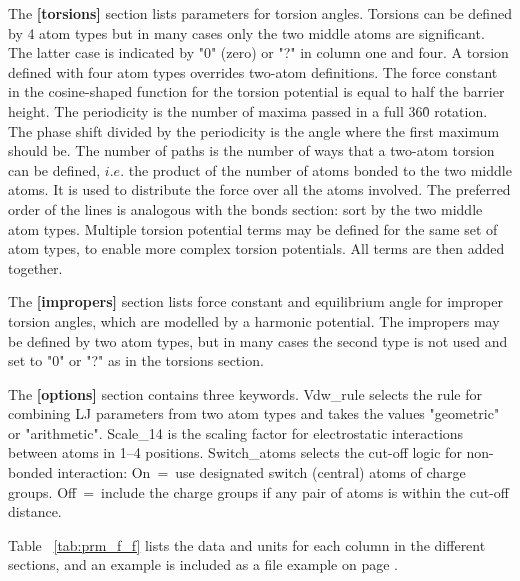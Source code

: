 \documentclass[a4paper,11pt]{article}
\let\origref\ref
\def\ref#1{\unskip~\origref{#1}}
\begin{document}
The   \textbf{[torsions]}  section   lists   parameters  for   torsion
angles. Torsions can be defined by 4 atom types but in many cases only
the two middle atoms are significant.  The latter case is indicated by
"0" (zero) or "?" in column one  and four. A torsion defined with four
atom types overrides  two-atom definitions. The force  constant in the
cosine-shaped function for the torsion  potential is equal to half the
barrier height.  The periodicity is the  number of maxima passed  in a
full 360\r{ } rotation. The phase  shift divided by the periodicity is
the angle  where the first maximum  should be. The number  of paths is
the number of ways that a  two-atom torsion can be defined, $i.e.$ the
product of the number  of atoms bonded to the two  middle atoms. It is
used  to  distribute  the  force  over all  the  atoms  involved.  The
preferred order of the lines is analogous with the bonds section: sort
by the two middle atom types.  Multiple torsion potential terms may be
defined for the same set of atom types, to enable more complex torsion
potentials. All terms are then added together.

The \textbf{[impropers]} section lists  force constant and equilibrium
angle for  improper torsion angles,  which are modelled by  a harmonic
potential. The impropers may be defined by two atom types, but in many
cases the  second type is  not used and  set to "0"  or "?" as  in the
torsions section.

The \textbf{[options]}  section contains three  keywords.  Vdw{\_}rule
selects the rule  for combining LJ parameters from two  atom types and
takes  the values  "geometric"  or "arithmetic".   Scale{\_}14 is  the
scaling factor  for electrostatic  interactions between atoms  in 1--4
positions. Switch{\_}atoms  selects the  cut-off logic  for non-bonded
interaction:  On~=~use designated  switch  (central)  atoms of  charge
groups. Off~=~include the charge groups if any pair of atoms is within
the cut-off distance.

Table \ref{tab:prm_f_f}  lists the data  and units for each  column in
the different sections,  and an example is included as  a file example
on page \pageref{fig:prm_ex}.


\setcounter{table}{8}
\end{document}
